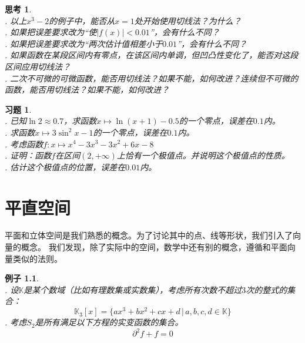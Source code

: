 \documentclass[12pt,UTF8]{ctexbook}
\newtheorem{ex}{例子}[section]
\newtheorem{sk}{思考}[section]
\newtheorem{xt}{习题}[section]
\begin{document}
\begin{sk}
    \mbox{} \\
    . 以上$x^3 - 2$的例子中，能否从$x=1$处开始使用切线法？为什么？\\
    . 如果把误差要求改为“使$|f(x)| < 0.01$”，会有什么不同？\\
    . 如果把误差要求改为“两次估计值相差小于$0.01$”，会有什么不同？\\
    . 如果函数在某段区间内有零点，在该区间内单调，但凹凸性变化了，能否对这段区间应用切线法？\\
    . 二次不可微的可微函数，能否用切线法？如果不能，如何改进？连续但不可微的函数，能否用切线法？如果不能，如何改进？
\end{sk}

\begin{xt}
    \mbox{} \\
    . 已知$\ln{2} \approx 0.7$，求函数$x\mapsto \ln{(x+1)} - 0.5$的一个零点，误差在$0.1$内。\\
    . 求函数$x\mapsto 3\sin^2{x} - 1$的一个零点，误差在$0.1$内。\\
    . 考虑函数$f:x\mapsto x^4-3 x^3-3 x^2+6 x-8$ \\
    . 证明：函数$f$在区间$(2,+\infty)$上恰有一个极值点。并说明这个极值点的性质。\\
    . 估计这个极值点的位置，误差在$0.01$内。
\end{xt}


\chapter{平直空间}
平面和立体空间是我们熟悉的概念。为了讨论其中的点、线等形状，我们引入了向量的概念。
我们发现，除了实际中的空间，数学中还有别的概念，遵循和平面向量类似的法则。

\begin{ex}
    \mbox{} \\
    . 设$\mathbb{K}$是某个数域（比如有理数集或实数集），考虑所有次数不超过$3$次的整式的集合：
    $$\mathbb{K}_3[x] = \{ax^3 + bx^2 + cx + d \, | \, a, b, c, d \in \mathbb{K}\}$$
    . 考虑$S_2$是所有满足以下方程的实变函数的集合。
    $$ \partial^2 f + f = 0$$
\end{ex}
\end{document}
